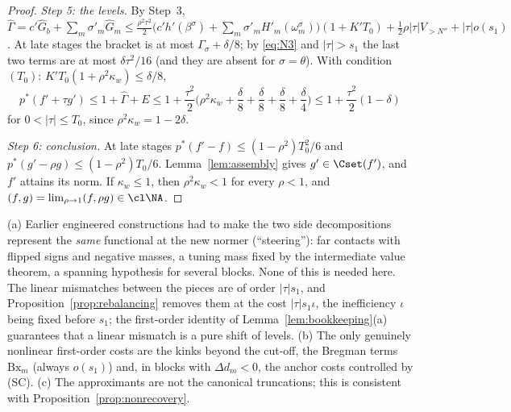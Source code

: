 \begin{proof}
\emph{Step 5: the levels.}  By Step~3,
$\hat\Gamma=c'\hat G_b+\sum_m\sigma'_m\hat G_m\le\frac{\rho^2\tau^2}2
\big(c'h'(\beta^\sigma)+\sum_m\sigma'_mH'_m(\omega^\sigma_m)\big)(1+K'T_0)
+\frac12\rho|\tau|V_{>N''}+|\tau|o(s_1)$.  At late stages the bracket is at
most $\Gamma_\sigma+\delta/8$; by \eqref{eq:N3} and $|\tau|>s_1$ the last two
terms are at most $\delta\tau^2/16$ (and they are absent for
$\sigma=\theta$).  With condition $(T_0)$: $K'T_0(1+\rho^2\kappa_w)\le\delta/8$,
\[
 p^*(f'+\tau g')\le1+\hat\Gamma+E\le1+\frac{\tau^2}2\Big(\rho^2\kappa_w+
 \frac\delta8+\frac\delta8+\frac\delta8+\frac\delta4\Big)\le1+\frac{\tau^2}2
 (1-\delta)
\]
for $0<|\tau|\le T_0$, since $\rho^2\kappa_w=1-2\delta$.

\emph{Step 6: conclusion.}  At late stages $p^*(f'-f)\le(1-\rho^2)T_0^2/6$
and $p^*(g'-\rho g)\le(1-\rho^2)T_0/6$.  Lemma~\ref{lem:assembly} gives
$g'\in\Cset(f')$, and $f'$ attains its norm.  If $\kappa_w\le1$, then
$\rho^2\kappa_w<1$ for every $\rho<1$, and $(f,g)=\lim_{\rho\to1}(f,\rho g)
\in\cl\NA$.
\end{proof}

\begin{remark}\label{rem:engineeredproof}
(a) Earlier engineered constructions had to make the two side
decompositions represent the \emph{same} functional at the new normer
\textup{(}``steering''\textup{)}: far contacts with flipped signs and negative
masses, a tuning mass fixed by the intermediate value theorem, a spanning
hypothesis for several blocks.  None of this is needed here.  The linear
mismatches between the pieces are of order $|\tau|s_1$, and
Proposition~\ref{prop:rebalancing} removes them at the cost
$|\tau|s_1\iota$, the inefficiency $\iota$ being fixed before $s_1$; the
first-order identity of Lemma~\ref{lem:bookkeeping}(a) guarantees that a
linear mismatch is a pure shift of levels.
(b) The only genuinely nonlinear first-order costs are the kinks beyond the
cut-off, the Bregman terms $\mathrm{Bx}_m$ (always $o(s_1)$) and, in blocks
with $\Delta d_m<0$, the anchor costs controlled by \textup{(SC)}.
(c) The approximants are not the canonical truncations; this is consistent
with Proposition~\ref{prop:nonrecovery}.
\end{remark}
